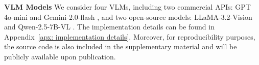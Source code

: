 \documentclass[10pt]{article} %
\begin{document}
\textbf{VLM Models}
We consider four VLMs, including two commercial APIs: GPT 4o-mini \citep{achiam2023gpt} and Gemini-2.0-flash \citep{comanici2025gemini}, and two open-source models: LLaMA-3.2-Vision \citep{grattafiori2024llama} and Qwen-2.5-7B-VL \citep{bai2025qwen2}.
The implementation details can be found in Appendix~\ref{apx: implementation details}.
Moreover, for reproducibility purposes, the source code is also included in the supplementary material and will be publicly available upon publication.

\end{document}
